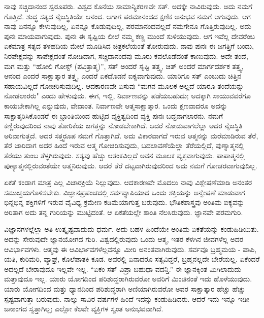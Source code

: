 ನಾವು ಸಚ್ಚಿದಾನಂದ ಸ್ವರೂಪರು. ವಿಶ್ವದ ಕೊನೆಯ ಸಾಮಾನ್ಯಿಕರಣವೇ ಸತ್. ಅದಕ್ಕೇ ನಾವಿರುವುದು. ಅದು ನಮಗೆ ಗೊತ್ತಿದೆ. ಶುದ್ಧ ಸತ್ಯದ ನೈಜಸ್ಥಿತಿಯೇ ಆನಂದ. ಆಗಾಗ ಪರಮಾನಂದದ ಕ್ಷಣಿಕ ಅನುಭವ ನಮಗೆ ಆಗುವುದು. ಆಗ ನಾವು ಏನನ್ನೂ ಕೇಳುವುದಿಲ್ಲ, ಏನನ್ನೂ ಕೊಡುವುದಿಲ್ಲ, ಪರಮಾನಂದವಲ್ಲದೆ ನಮಗೇನೂ ಗೊತ್ತಿರುವುದಿಲ್ಲ. ಅದು ಪುನಃ ಮಾಯವಾಗುವುದು. ಪುನಃ ಈ ಸೃಷ್ಟಿಯ ಲೀಲೆ ನಮ್ಮ ಕಣ್ಣ ಮುಂದೆ ಸುಳಿಯುವುದು. ಆಗ ಇವೆಲ್ಲ ದೇವರೆಂಬ ಏಕಮಾತ್ರ ಸತ್ಯದ ತಳಹದಿಯ ಮೇಲೆ ಮೂಡಿಸಿದ ಚಿತ್ರಕಲೆಯಂತೆ ತೋರುವುದು. ನಾವು ಪುನಃ ಈ ಜಗತ್ತಿಗೆ ಬಂದು, ನಿರಪೇಕ್ಷವನ್ನು ಸಾಪೇಕ್ಷದಂತೆ ನೋಡಿದಾಗ, ಸಚ್ಚಿದಾನಂದವು ಮೂರು ಕವಲೊಡೆದಂತೆ ಕಾಣುವುದು. ಅದೇ ತಂದೆ, ಮಗ ಮತ್ತು “ಹೋಲಿ ಗೋಸ್ಟ್ (ಪವಿತ್ರಾತ್ಮ)'', ಸತ್ ಅಂದರೆ ಸೃಷ್ಟಿ ತತ್ತ್ವ, ಚಿತ್ ಅಂದರೆ ಮಾರ್ಗದರ್ಶಕ ತತ್ತ್ವ, ಆನಂದ ಎಂದರೆ ಸಾಕ್ಷಾತ್ಕಾರ ತತ್ತ್ವ, ಎಂದರೆ ಏಕದೊಡನೆ ಐಕ್ಯವಾಗುವುದು. ಯಾರಿಗೂ ಸತ್ ಎಂಬುದು ಚಿತ್ತಿನ ಸಹಾಯವಿಲ್ಲದೆ ಗೋಚರಿಸುವುದಿಲ್ಲ. ಆದಕಾರಣವೇ ಏಸುವು “ಮಗನ ಮೂಲಕ ಅಲ್ಲದೆ ಯಾರೂ ತಂದೆಯನ್ನು ನೋಡಲಾರರು" ಎಂದು ಹೇಳುವುದು. ಈಗ, ಇಲ್ಲಿ, ನಿರ್ವಾಣವನ್ನು ಪಡೆಯಬಹುದು; ಅದಕ್ಕಾಗಿ ಸಾಯುವವರೆಗೂ ಕಾಯಬೇಕಾಗಿಲ್ಲ ಎನ್ನುವುದು, ವೇದಾಂತ. ನಿರ್ವಾಣವೇ ಆತ್ಮಸಾಕ್ಷಾತ್ಕಾರ. ಒಂದು ಕ್ಷಣವಾದರೂ ಅದನ್ನು ಸಾಕ್ಷಾತ್ಕರಿಸಿಕೊಂಡರೆ ಈ ಭ್ರಾಂತಿಯಿಂದ ಹುಟ್ಟಿದ ವ್ಯಕ್ತಿತ್ವದಿಂದ ವ್ಯಕ್ತಿ ಪುನಃ ಬದ್ದನಾಗಲಾರನು. ನಮಗೆ ಕಣ್ಣಿರುವುದರಿಂದ ನಾವು ತೋರಿಕೆಯ ಜಗತ್ತನ್ನು ನೋಡಬೇಕಾಗಿದೆ. ಆದರೆ ನೋಡುವಾಗಲೆಲ್ಲಾ ಅದರ ನೈಜಸ್ಥಿತಿ ಅರಿವಾಗುತ್ತದೆ. ಅದರ ಸತ್ತ್ವರೂಪ ನಮಗೆ ಗೊತ್ತಾಗಿದೆ. ಅದು ವಿಕಾರವಾಗದೆ ಇರುವ ಆತ್ಮನನ್ನು ಮರೆಮಾಡಿರುವ ತೆರೆ, ತೆರೆ ಜಾರಿದಾಗ ಅದರ ಹಿಂದೆ ಇರುವ ಆತ್ಮ ಗೋಚರಿಸುವುದು, ಬದಲಾವಣೆಯೆಲ್ಲಾ ತೆರೆಯಲ್ಲಿದೆ, ಪುಣ್ಯಾತ್ಮನಲ್ಲಿ ತೆರೆಯು ತುಂಬ ತೆಳ್ಳಗಿರುವುದು. ಸತ್ಯವು ಹೆಚ್ಚು ಆತಂಕವಿಲ್ಲದೆ ಅವನ ಮೂಲಕ ವ್ಯಕ್ತವಾಗುವುದು. ಪಾಪಾತ್ಮನಲ್ಲಿ ಪುಣ್ಯಾತ್ಮನಲ್ಲಿರುವಂತೆಯೇ ಆತ್ಮನಿರುವುದು. ಆದರೆ ತೆರೆ ದಟ್ಟವಾಗಿರುವುದರಿಂದ ಅದು ನಮಗೆ ಗೋಚರವಾಗುವುದಿಲ್ಲ.

ಏಕತೆ ಕಂಡಾಗ ಮಾತ್ರ ಎಲ್ಲ ವಿಚಾರಕ್ರಿಯೆ ನಿಲ್ಲುವುದು. ಆದಕಾರಣವೇ ಮೊದಲು ನಾವು ವಿಶ್ಲೇಷಣೆಮಾಡಿ ಅನಂತರ ಸಮುಚ್ಚಯಗೊಳಿಸಬೇಕು. ವಿಜ್ಞಾನಪ್ರಪಂಚದಲ್ಲಿ ಸರ್ವವ್ಯಾಪಿಯಾದ ಒಂದು ಶಕ್ತಿಯನ್ನು ಅನ್ವೇಷಣೆ ಮಾಡುವಾಗ ಭಿನ್ನಭಿನ್ನ ಶಕ್ತಿಗಳಿಗೆ ಇರುವ ವೈವಿಧ್ಯ ಕ್ರಮೇಣ ಕಡಿಮೆಯಾಗುತ್ತ ಬರುವುದು. ಭೌತಿಕಶಾಸ್ತ್ರವು ಅಂತಿಮ ಐಕ್ಯವನ್ನು ಅರಿತಾಗ ಅದು ತನ್ನ ಗುರಿಯನ್ನು ಮುಟ್ಟಿದಂತೆ. ಆ ಏಕತೆಯಲ್ಲೇ ಶಾಂತಿ ನೆಲಸಿರುವುದು. ಜ್ಞಾನವೇ ಪರಮಗುರಿ.

ವಿಜ್ಞಾನಗಳಲ್ಲೆಲ್ಲಾ ಅತಿ ಉತ್ಕೃಷ್ಟವಾದುದು ಧರ್ಮ. ಅದು ಬಹಳ ಹಿಂದೆಯೇ ಅಂತಿಮ ಏಕತೆಯನ್ನು ಕಂಡುಹಿಡಿಯಿತು. ಅದನ್ನು ಸೇರುವುದೇ ಜ್ಞಾನಯೋಗದ ಗುರಿ. ವಿಶ್ವದಲ್ಲಿರುವುದು ಒಂದು ಆತ್ಮ, ಇತರ ಕೆಳಗಿನ ಜೀವಗಳೆಲ್ಲ ಅದರ ಆವಿರ್ಭಾವಗಳು. ಆತ್ಮವು ಈ ಆವಿರ್ಭಾವಗಳೆಲ್ಲವನ್ನೂ ಮೀರಿ ಅನಂತವಾಗಿರುವುದು. ಸರ್ವವೂ ಬ್ರಹ್ಮಮಯ - ಪಾಪಿ, ಯತಿ, ಕುರಿಮರಿ, ವ್ಯಾಘ್ರ, ಕೊಲೆಪಾತಕಿ ಕೂಡ. ಅವರಲ್ಲಿ ಏನಾದರೂ ಸತ್ಯವಿದ್ದರೆ, ಬ್ರಹ್ಮನಲ್ಲದೇ ಬೇರೆಯಲ್ಲ. ಏಕೆಂದರೆ ಅದಲ್ಲದೆ ಬೇರಾವುದೂ ಇಲ್ಲವೇ ಇಲ್ಲ. “ಏಕಂ ಸತ್ ವಿಪ್ರಾ ಬಹುಧಾ ವದನ್ತಿ.” ಈ ಜ್ಞಾನಕ್ಕಿಂತ ಮಿಗಿಲಾದುದು ಮತ್ತಾವುದೂ ಇಲ್ಲ. ಯಾರು ಯೋಗದಿಂದ ಪರಿಶುದ್ಧರಾಗಿರುವರೋ ಅವರಿಗೆ ಮಿಂಚಿನಂತೆ ಇದು ಹೊಳೆಯುವುದು. ಯಾರು ಯೋಗದಿಂದ ಮತ್ತು ಧ್ಯಾನದಿಂದ ಪರಿಶುದ್ಧರಾಗಿ ಅಣಿಯಾಗಿರುವರೋ ಅವರ ಸಾಕ್ಷಾತ್ಕಾರ ಹೆಚ್ಚು ಹೆಚ್ಚು ಸ್ಪಷ್ಟವಾಗುತ್ತಾ ಬರುವುದು. ನಾಲ್ಕು ಸಾವಿರ ವರ್ಷಗಳ ಹಿಂದೆ ಇದನ್ನು ಕಂಡುಹಿಡಿದರು. ಆದರೆ ಇದು ಇನ್ನೂ ಇಡೀ ಜನಾಂಗದ ಸ್ವತ್ತಾಗಿಲ್ಲ; ಎಲ್ಲೋ ಕೆಲವೇ ವ್ಯಕ್ತಿಗಳ ಸ್ವಂತ ಅನುಭವವಾಗಿದೆ.

